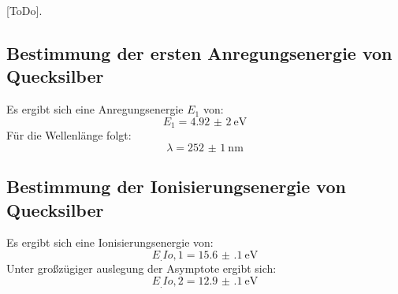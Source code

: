 \begin{table}
\centering
\caption{[ToDo].}

\label{tab:Energieverteilung}
\end{table}

\subsection{Bestimmung der ersten Anregungsenergie von Quecksilber}

Es ergibt sich eine Anregungsenergie $E_1$ von:
\[
E_1 = \SI{4,92(2)}{\electronvolt}
\]
Für die Wellenlänge folgt:
\[
\lambda = \SI{252(1)}{\nano\metre}
\]

\subsection{Bestimmung der Ionisierungsenergie von Quecksilber}

Es ergibt sich eine Ionisierungsenergie von:
\[
E_.{Io,1} = \SI{15.6(1)}{\electronvolt}
\]
Unter großzügiger auslegung der Asymptote ergibt sich:
\[
E_.{Io,2} = \SI{12.9(1)}{\electronvolt}
\]